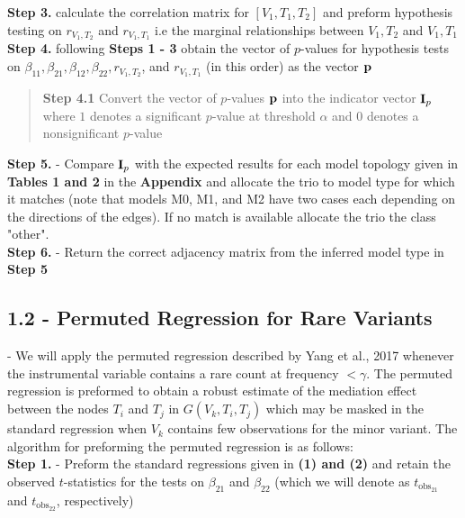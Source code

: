 \documentclass[12pt]{report}
\begin{document}
\noindent \textbf{Step 3.} calculate the correlation matrix for $[V_1, T_1, T_2]$ and preform hypothesis testing on $r_{V_1,T_2}$ and $r_{V_1, T_1}$ i.e the marginal relationships between $V_1,T_2$ and $V_1, T_1$ \\


\noindent \textbf{Step 4.} following \textbf{Steps 1 - 3} obtain the vector of $p$-values for hypothesis tests on $\beta_{11}, \beta_{21}, \beta_{12}, \beta_{22}, r_{V_1,T_2}$, and $r_{V_1, T_1}$ (in this order) as the vector $\bf {p}$\\

\begin{quote}
\textbf{Step 4.1} Convert the vector of $p$-values $\bf {p}$ into the indicator vector ${\bf I}_p$ where $1$ denotes a significant $p$-value at threshold $\alpha$ and $0$ denotes a nonsignificant $p$-value \\
\end{quote}

\noindent\textbf{Step 5.} - Compare ${\bf I}_p$ with the expected results for each model topology given in \textbf{Tables 1 and 2} in the \textbf{Appendix} and allocate the trio to model type for which it matches (note that models M0, M1, and M2 have two cases each depending on the directions of the edges). If no match is available allocate the trio the class "other". \\

\noindent\textbf{Step 6.} - Return the correct adjacency matrix from the inferred model type in \textbf{Step 5}


\subsection*{1.2 - Permuted Regression for Rare Variants} - We will apply the permuted regression described by Yang et al., 2017 whenever the instrumental variable contains a rare count at frequency $< \gamma$. The permuted regression is preformed to obtain a robust estimate of the mediation effect between the nodes $T_i$ and $T_j$ in $G(V_k, T_i, T_j)$ which may be masked in the standard regression when $V_k$ contains few observations for the minor variant. The algorithm for preforming the permuted regression is as follows:\\


\noindent\textbf{Step 1.} - Preform the standard regressions given in \textbf{(1) and (2)} and retain the observed $t$-statistics for the tests on $\beta_{21}$ and $\beta_{22}$ (which we will denote as $t_{\text{obs}_{21}}$ and $t_{\text{obs}_{22}}$, respectively)
\end{document}
